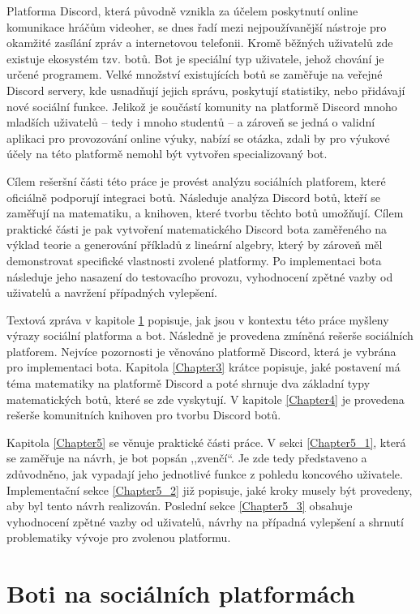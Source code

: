 \documentclass[FM]{tulthesis}
\begin{document}
	Platforma Discord, která původně vznikla za účelem poskytnutí online komunikace hráčům videoher, se dnes řadí mezi nejpoužívanější nástroje pro okamžité zasílání zpráv a internetovou telefonii. Kromě běžných uživatelů zde existuje ekosystém tzv. botů. Bot je speciální typ uživatele, jehož chování je určené programem. Velké množství existujících botů se zaměřuje na veřejné Discord servery, kde usnadňují jejich správu, poskytují statistiky, nebo přidávají nové sociální funkce. Jelikož je součástí komunity na platformě \mbox{Discord} mnoho mladších uživatelů – tedy i mnoho studentů – a zároveň se jedná o validní aplikaci pro provozování online výuky, nabízí se otázka, zdali by pro výukové účely na této platformě nemohl být vytvořen specializovaný bot.	
	
	Cílem rešeršní části této práce je provést analýzu sociálních platforem, které oficiálně podporují integraci botů. Následuje analýza Discord botů, kteří se zaměřují na matematiku, a knihoven, které tvorbu těchto botů umožňují. Cílem praktické části je pak vytvoření matematického Discord bota zaměřeného na výklad teorie a generování příkladů z lineární algebry, který by zároveň měl demonstrovat specifické vlastnosti zvolené platformy. Po implementaci bota následuje jeho nasazení do testovacího provozu, vyhodnocení zpětné vazby od uživatelů a navržení případných vylepšení.
	
	Textová zpráva v kapitole \ref{Chapter2} popisuje, jak jsou v kontextu této práce myšleny výrazy sociální platforma a bot. Následně je provedena zmíněná rešerše sociálních platforem. Nejvíce pozornosti je věnováno platformě Discord, která je  vybrána pro implementaci bota. Kapitola \ref{Chapter3} krátce popisuje, jaké postavení má téma matematiky na platformě Discord a poté shrnuje dva základní typy matematických botů, které se zde vyskytují. V kapitole \ref{Chapter4} je provedena rešerše komunitních knihoven pro tvorbu Discord botů.
	
	Kapitola \ref{Chapter5} se věnuje praktické části práce. V sekci \ref{Chapter5_1}, která se zaměřuje na návrh, je bot popsán ,,zvenčí``. Je zde tedy představeno a zdůvodněno, jak vypadají jeho jednotlivé funkce z pohledu koncového uživatele. Implementační sekce \ref{Chapter5_2} již popisuje, jaké kroky musely být provedeny, aby byl tento návrh realizován. Poslední sekce \ref{Chapter5_3} obsahuje vyhodnocení zpětné vazby od uživatelů, návrhy na případná vylepšení a shrnutí problematiky vývoje pro zvolenou platformu.
	
	\chapter{Boti na sociálních platformách}\label{Chapter2}
	
\end{document}
